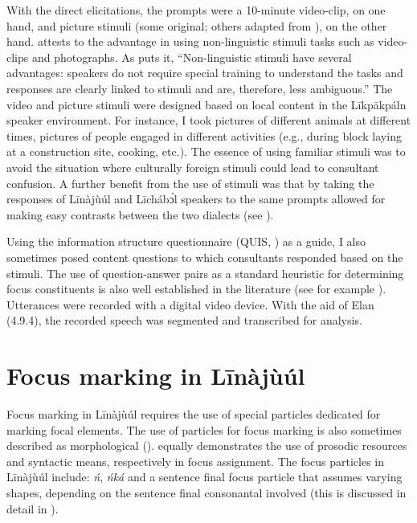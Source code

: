 \documentclass[output=paper,colorlinks,citecolor=brown]{langscibook}
\begin{document}
With the direct elicitations, the prompts were a 10-minute video-clip, on one hand, and picture stimuli (some original; others adapted from \citealt{SkopeteasEtAl2006}), on the other hand. \citet[61]{Chelliah2013} attests to the advantage in using non-linguistic stimuli tasks such as video-clips and photographs. As \citet{Chelliah2013} puts it, “Non-linguistic stimuli have several advantages: speakers do not require special training to understand the tasks and responses are clearly linked to stimuli and are, therefore, less ambiguous.” The video and picture stimuli were designed based on local content in the Līkpākpáln speaker environment. For instance, I took pictures of different animals at different times, pictures of people engaged in different activities (e.g., during block laying at a construction site, cooking, etc.). The essence of using familiar stimuli was to avoid the situation where culturally foreign stimuli could lead to consultant confusion. A further benefit from the use of stimuli was that by taking the responses of Līnàjùúl and Līcháb\'{ɔ}l speakers to the same prompts allowed for making easy contrasts between the two dialects (see \citealt[56]{Majid2012}).

Using the information structure questionnaire (QUIS, \citealt{SkopeteasEtAl2006}) as a guide, I also sometimes posed content questions to which consultants responded based on the stimuli. The use of question-answer pairs as a standard heuristic for determining focus constituents is also well established in the literature (see for example \citealt{Dik1978, Krifka2007, Watters1979}). Utterances were recorded with a digital video device. With the aid of Elan (4.9.4), the recorded speech was segmented and transcribed for analysis.

\section{Focus marking in Līnàjùúl }\label{sec:bisilki:5}

Focus marking in Līnàjùúl requires the use of special particles dedicated for marking focal elements. The use of particles for focus marking is also sometimes described as morphological (\citealt{Childs1997, HartmannZimmermann2009, Schwarz2009, VanPutten2016}). \citet{Rochemont1986} equally demonstrates the use of prosodic resources and syntactic means, respectively in focus assignment. The focus particles in Līnàjùúl include: \textit{ń}, \textit{ńká} and a sentence final focus particle that assumes varying shapes, depending on the sentence final consonantal involved (this is discussed in detail in ).
\end{document}
